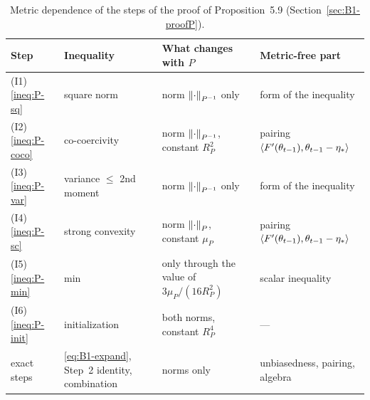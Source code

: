 \begin{table}[ht]
\centering
\small
\begin{tabular}{@{}p{2.0cm}p{2.5cm}p{4.8cm}p{5.2cm}@{}}
\toprule
Step & Inequality & What changes with $P$ & Metric-free part \\
\midrule
(I1) \eqref{ineq:P-sq} & square norm & norm $\left\|\cdot\right\|_{P^{-1}}$ only & form of the inequality \\
(I2) \eqref{ineq:P-coco} & co-coercivity & norm $\left\|\cdot\right\|_{P^{-1}}$, constant $R_P^2$ &
  pairing $\left\langle F'(\theta_{t-1}), \theta_{t-1}-\eta_\ast \right\rangle$ \\
(I3) \eqref{ineq:P-var} & variance $\le$ 2nd moment & norm $\left\|\cdot\right\|_{P^{-1}}$ only & form of the inequality \\
(I4) \eqref{ineq:P-sc} & strong convexity & norm $\left\|\cdot\right\|_P$, constant $\mu_P$ &
  pairing $\left\langle F'(\theta_{t-1}), \theta_{t-1}-\eta_\ast \right\rangle$ \\
(I5) \eqref{ineq:P-min} & min & only through the value of $3\mu_P/(16R_P^2)$ & scalar inequality \\
(I6) \eqref{ineq:P-init} & initialization & both norms, constant $R_P^4$ & --- \\
exact steps & \eqref{eq:B1-expand}, Step~2 identity, combination & norms only & unbiasedness, pairing, algebra \\
\bottomrule
\end{tabular}
\caption{Metric dependence of the steps of the proof of Proposition~5.9 (Section~\ref{sec:B1-proofP}).}
\label{tab:B1-metric}
\end{table}

